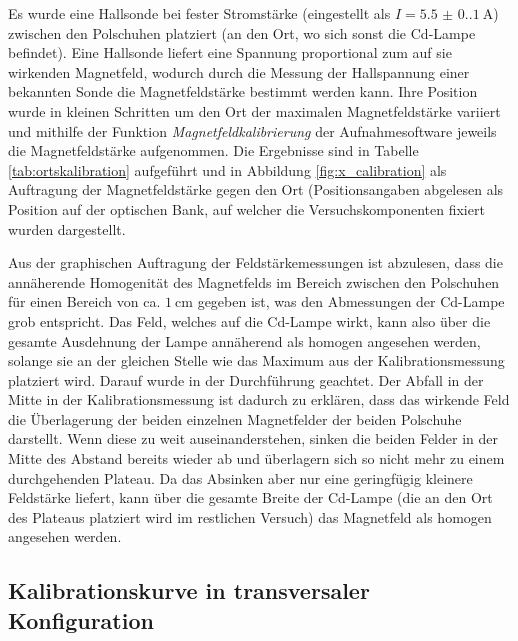 Es wurde eine Hallsonde bei fester Stromstärke (eingestellt als $I=\SI{5.5(0.1)}{\ampere}$) zwischen den Polschuhen platziert (an den Ort, wo sich sonst die Cd-Lampe befindet). Eine Hallsonde liefert eine Spannung proportional zum auf sie wirkenden Magnetfeld, wodurch durch die Messung der Hallspannung einer bekannten Sonde die Magnetfeldstärke bestimmt werden kann. Ihre Position wurde in kleinen Schritten um den Ort der maximalen Magnetfeldstärke variiert und mithilfe der Funktion \textit{Magnetfeldkalibrierung} der Aufnahmesoftware jeweils die Magnetfeldstärke aufgenommen. Die Ergebnisse sind in Tabelle \ref{tab:ortskalibration} aufgeführt und in Abbildung \ref{fig:x_calibration} als Auftragung der Magnetfeldstärke gegen den Ort (Positionsangaben abgelesen als Position auf der optischen Bank, auf welcher die Versuchskomponenten fixiert wurden \cite[6]{Versuchsanleitung401} dargestellt.


Aus der graphischen Auftragung der Feldstärkemessungen ist abzulesen, dass die annäherende Homogenität des Magnetfelds im Bereich zwischen den Polschuhen für einen Bereich von ca.  $\SI{1}{\centi\meter}$ gegeben ist, was den Abmessungen der Cd-Lampe grob entspricht. Das Feld, welches auf die Cd-Lampe wirkt, kann also über die gesamte Ausdehnung der Lampe annäherend als homogen angesehen werden, solange sie an der gleichen Stelle wie das Maximum aus der Kalibrationsmessung platziert wird. Darauf wurde in der Durchführung geachtet. Der Abfall in der Mitte in der Kalibrationsmessung ist dadurch zu erklären, dass das wirkende Feld die Überlagerung der beiden einzelnen Magnetfelder der beiden Polschuhe darstellt. Wenn diese zu weit auseinanderstehen, sinken die beiden Felder in der Mitte des Abstand bereits wieder ab und überlagern sich so nicht mehr zu einem durchgehenden Plateau. Da das Absinken aber nur eine geringfügig kleinere Feldstärke liefert, kann über die gesamte Breite der Cd-Lampe (die an den Ort des Plateaus platziert wird im restlichen Versuch) das Magnetfeld als homogen angesehen werden.

\subsection{Kalibrationskurve in transversaler Konfiguration}

